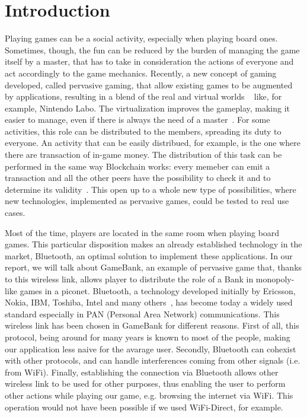 \section{Introduction}

Playing games can be a social activity, especially when playing board ones. 
Sometimes, though, the fun can be reduced by the burden of managing the 
game itself by a master, that has to take in consideration the actions of 
everyone and act accordingly to the game mechanics. Recently, a new  concept of 
gaming developed, called pervasive gaming, that allow existing games to be 
augmented by applications, resulting in a blend of the real and virtual worlds 
~\cite{arango17} like, for example, Nintendo Labo.
The virtualization improves the gameplay, making it easier to manage, even if 
there is always the need of a master~\cite{bjork01}.
For some activities, this role can be distributed to the members, spreading its 
duty to everyone. An activity that can be easily distribued, for example, is the 
one where there are transaction of in-game money. The distribution of this task 
can be performed in the same way Blockchain works: every memeber can emit a 
transaction and all the other peers have the possibility to check it and to 
determine its validity~\cite{nakamoto08}. This open up to a whole new type of 
possibilities, where new technologies, implemented as pervasive games, could be 
tested to real use cases.

Most of the time, players are located in the same room when playing board 
games. This particular disposition makes an already established technology in 
the market, Bluetooth, an optimal solution to implement these applications. In 
our report, we will talk about GameBank, an example of pervasive game that, 
thanks to this wireless link, allows player to distribute the role of a Bank in 
monopoly-like games in a piconet.
Bluetooth, a technology developed initially by Ericsson, Nokia, IBM, Toshiba, 
Intel and many others~\cite{haartsen00}, has become today a widely used
standard especially in PAN (Personal Area Network) communications. This
wireless link has been chosen in GameBank for different reasons. First of all,
this protocol, being around for many years is known to most of the people,
making our application less naive for the avarage user. Secondly, Bluetooth can
cohexist with other protocols, and can handle interferences coming from other
signals (i.e. from WiFi). Finally, establishing the connection via Bluetooth
allows other wireless link to be used for other purposes, thus enabling the
user to perform other actions while playing our game, e.g. browsing the
internet via WiFi. This operation would not have been possible if we used 
WiFi-Direct, for example.\\

